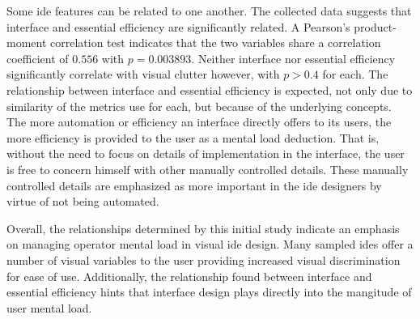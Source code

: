 Some \ac{ide} features can be related to one another. The
collected data suggests that interface and essential efficiency are
significantly related.  A Pearson's product-moment correlation test
indicates that the two variables share a correlation coefficient of $0.556$
with $p=0.003893$. Neither interface nor essential efficiency significantly
correlate with visual clutter however, with $p>0.4$ for each.  The
relationship between interface and essential efficiency is expected, not
only due to similarity of the metrics use for each, but because of the
underlying concepts. The more automation or efficiency an interface
directly offers to its users, the more efficiency is
provided to the user as a mental load deduction. That is, without the need
to focus on details of implementation in the interface, the user is free to
concern himself with other manually controlled details. These
manually controlled details are emphasized as more important in the
\ac{ide} designers by virtue of not being automated.

Overall, the relationships determined by this initial study indicate an
emphasis on managing operator mental load in visual \ac{ide} design. Many
sampled \acp{ide} offer a number of visual variables to the user providing
increased visual discrimination for ease of use. Additionally, the
relationship found between interface and essential efficiency hints that
interface design plays directly into the mangitude of user mental load.

